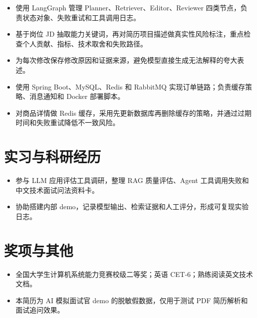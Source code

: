 \documentclass{resume}
\begin{document}
\begin{itemize}
  \item 使用 LangGraph 管理 Planner、Retriever、Editor、Reviewer 四类节点，负责状态对象、失败重试和工具调用日志。
  \item 基于岗位 JD 抽取能力关键词，再对简历项目描述做真实性风险标注，重点检查个人贡献、指标、技术取舍和失败路径。
  \item 为每次修改保存修改原因和证据来源，避免模型直接生成无法解释的夸大表述。
\end{itemize}

\begin{itemize}
  \item 使用 Spring Boot、MySQL、Redis 和 RabbitMQ 实现订单链路；负责缓存策略、消息通知和 Docker 部署脚本。
  \item 对商品详情做 Redis 缓存，采用先更新数据库再删除缓存的策略，并通过过期时间和失败重试降低不一致风险。
\end{itemize}

\section{实习与科研经历}
\begin{itemize}
  \item 参与 LLM 应用评估工具调研，整理 RAG 质量评估、Agent 工具调用失败和中文技术面试问法资料卡。
  \item 协助搭建内部 demo，记录模型输出、检索证据和人工评分，形成可复现实验日志。
\end{itemize}

\section{奖项与其他}
\begin{itemize}
  \item 全国大学生计算机系统能力竞赛校级二等奖；英语 CET-6；熟练阅读英文技术文档。
  \item 本简历为 AI 模拟面试官 demo 的脱敏假数据，仅用于测试 PDF 简历解析和面试追问效果。
\end{itemize}
\end{document}
